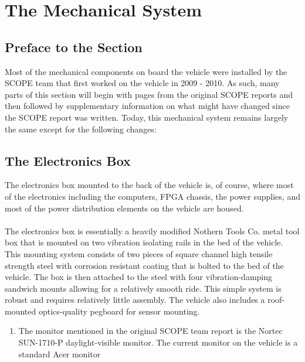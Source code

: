 \section{The Mechanical System}

\subsection{Preface to the Section}
Most of the mechanical components on board the vehicle were installed by the SCOPE team that first worked on the vehicle in 2009 - 2010. As such, many parts of this section will begin with pages from the original SCOPE reports and then followed by supplementary information on what might have changed since the SCOPE report was written. 
%
Today, this mechanical system remains largely the same except for the following changes:

\subsection{The Electronics Box}

The electronics box mounted to the back of the vehicle is, of course, where most of the electronics including the computers, FPGA chassis, the power supplies, and most of the power distribution elements on the vehicle are housed.\\ \\
%
\noindent The electronics box is essentially a heavily modified Nothern Tools Co. metal tool box that is mounted on two vibration isolating rails in the bed of the vehicle. This mounting system consists of two pieces of square channel high tensile strength steel with corrosion resistant coating that is bolted to the bed of the vehicle. The box is then attached to the steel with four vibration-damping sandwich mounts allowing for a relatively smooth ride. This simple system is robust and requires relatively little assembly. The vehicle also includes a roof-mounted optics-quality pegboard for sensor mounting. 

\begin{enumerate}
\item The monitor mentioned in the original SCOPE team report is the Nortec SUN-1710-P daylight-visible monitor. The current monitor on the vehicle is a standard Acer monitor
\end{enumerate}

\newpage







